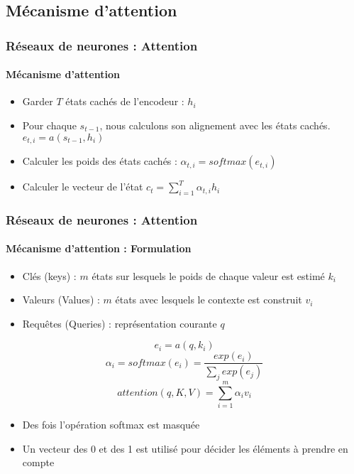 \documentclass[xcolor=table]{beamer}
\begin{document}
\subsection{Mécanisme d'attention}

\begin{frame}
	\frametitle{Réseaux de neurones : Attention}
	\framesubtitle{Mécanisme d'attention}
	
	\begin{center}
	\end{center}
	
	\vskip-6pt
	\begin{itemize}
		\item Garder $T$ états cachés de l'encodeur : $h_i$
		\item Pour chaque $s_{t-1}$, nous calculons son alignement avec les états cachés.
		$ e_{t, i} = a(s_{t-1}, h_i) $
		\item Calculer les poids des états cachés : $\alpha_{t, i} = softmax(e_{t, i})$
		\item Calculer le vecteur de l'état $c_t = \sum_{i=1}^{T} \alpha_{t, i} h_i$
	\end{itemize}
	
\end{frame}

\begin{frame}
	\frametitle{Réseaux de neurones : Attention}
	\framesubtitle{Mécanisme d'attention : Formulation}
	
	\begin{itemize}
		\item Clés (keys) : $m$ états sur lesquels le poids de chaque valeur est estimé $k_i$
		\item Valeurs (Values) : $m$ états avec lesquels le contexte est construit $v_i$
		\item Requêtes (Queries) : représentation courante $q$
	\end{itemize}
	
	\[e_i = a(q, k_i)\]
	\[\alpha_i = softmax(e_i) = \frac{exp(e_i)}{\sum_j exp(e_j)}\]
	\[attention(q, K, V) = \sum_{i=1}^{m} \alpha_i v_i\]
	
	\begin{itemize}
		\item Des fois l'opération softmax est masquée
		\item Un vecteur des 0 et des 1 est utilisé pour décider les éléments à prendre en compte
	\end{itemize}
	
\end{frame}
\end{document}
